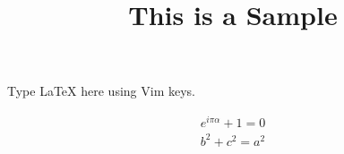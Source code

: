 \documentclass{article}
\title{This is a Sample}
\date{}
\begin{document}
\maketitle
Type LaTeX here using Vim keys.

\begin{align*}
e^{i\pi\alpha} + 1 = 0 \\
b^2 +c^2 = a^2
\end{align*}
\end{document}
